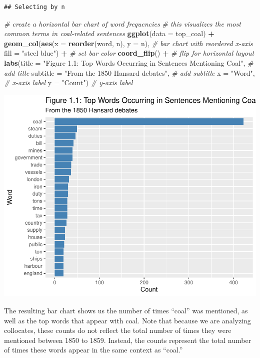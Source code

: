 \documentclass[
]{article}
\newenvironment{Shaded}{\begin{snugshade}}{\end{snugshade}}
\newcommand{\AttributeTok}[1]{\textcolor[rgb]{0.13,0.29,0.53}{#1}}
\newcommand{\CommentTok}[1]{\textcolor[rgb]{0.56,0.35,0.01}{\textit{#1}}}
\newcommand{\FunctionTok}[1]{\textcolor[rgb]{0.13,0.29,0.53}{\textbf{#1}}}
\newcommand{\NormalTok}[1]{#1}
\newcommand{\SpecialCharTok}[1]{\textcolor[rgb]{0.81,0.36,0.00}{\textbf{#1}}}
\newcommand{\StringTok}[1]{\textcolor[rgb]{0.31,0.60,0.02}{#1}}
\begin{document}
\begin{verbatim}
## Selecting by n
\end{verbatim}

\begin{Shaded}
\begin{Highlighting}[]
\CommentTok{\# create a horizontal bar chart of word frequencies}
\CommentTok{\# this visualizes the most common terms in coal{-}related sentences}
\FunctionTok{ggplot}\NormalTok{(}\AttributeTok{data =}\NormalTok{ top\_coal) }\SpecialCharTok{+}  
  \FunctionTok{geom\_col}\NormalTok{(}\FunctionTok{aes}\NormalTok{(}\AttributeTok{x =} \FunctionTok{reorder}\NormalTok{(word, n), }\AttributeTok{y =}\NormalTok{ n), }\CommentTok{\# bar chart with reordered x{-}axis}
           \AttributeTok{fill =} \StringTok{"steel blue"}\NormalTok{) }\SpecialCharTok{+} \CommentTok{\# set bar color}
  \FunctionTok{coord\_flip}\NormalTok{() }\SpecialCharTok{+} \CommentTok{\# flip for horizontal layout}
  \FunctionTok{labs}\NormalTok{(}\AttributeTok{title =} \StringTok{"Figure 1.1: Top Words Occurring in Sentences Mentioning Coal"}\NormalTok{, }\CommentTok{\# add title}
       \AttributeTok{subtitle =} \StringTok{"From the 1850 Hansard debates"}\NormalTok{, }\CommentTok{\# add subtitle}
       \AttributeTok{x =} \StringTok{"Word"}\NormalTok{, }\CommentTok{\# x{-}axis label}
       \AttributeTok{y =} \StringTok{"Count"}\NormalTok{) }\CommentTok{\# y{-}axis label}
\end{Highlighting}
\end{Shaded}

\includegraphics[width=0.8\linewidth]{ch1-11.25.2024_files/figure-latex/unnamed-chunk-27-1}

The resulting bar chart shows us the number of times ``coal'' was
mentioned, as well as the top words that appear with coal. Note that
because we are analyzing collocates, these counts do not reflect the
total number of times they were mentioned between 1850 to 1859. Instead,
the counts represent the total number of times these words appear in the
same context as ``coal.''
\end{document}
